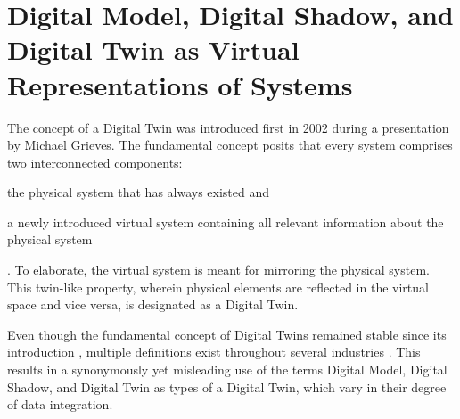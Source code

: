     \section[Virtual Representation of Systems]{Digital Model, Digital Shadow, and Digital Twin as Virtual Representations of Systems} \label{sec:DMDSDT}
    The concept of a Digital Twin was introduced first in 2002 during a presentation by Michael Grieves. The fundamental concept posits that every system comprises two interconnected components: 
    \begin{enumerate*}[label=\Alph*)]
        \item the physical system that has always existed and
        \item a newly introduced virtual system containing all relevant information about the physical system
    \end{enumerate*}. To elaborate, the virtual system is meant for mirroring the physical system. This twin-like property, wherein physical elements are reflected in the virtual space and vice versa, is designated as a Digital Twin. \cite[p.~93]{book:grieves2017}\cite[p.~1016f]{DMDSDTcategoricalLitReview}
    
    Even though the fundamental concept of Digital Twins remained stable since its introduction \cite[p.~92]{book:grieves2017}, multiple definitions exist throughout several industries \cite[p.~1017]{DMDSDTcategoricalLitReview}. This results in a synonymously yet misleading use of the terms Digital Model, Digital Shadow, and Digital Twin as types of a Digital Twin, which vary in their degree of data integration.
    
